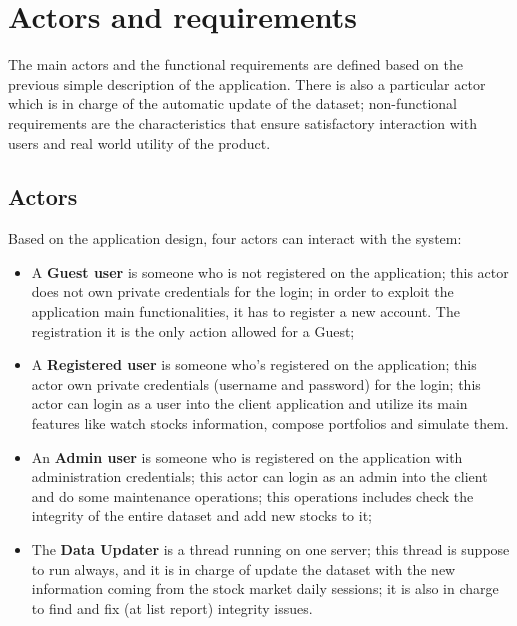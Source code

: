 \chapter{Actors and requirements}
The main actors and the functional requirements are defined based on the previous
simple description of the application. There is also a 
particular actor which is in charge of the automatic update of the dataset; non-functional
requirements are the characteristics that ensure satisfactory interaction with users and 
real world utility of the product.

\section{Actors}
Based on the application design, four actors can interact with the system:
\begin{itemize}
    \item A \textbf{Guest user} is someone who is not registered on the application; this actor does not 
own private credentials for the login; in order to exploit the application main functionalities, 
it has to register a new account. The registration it is the only action allowed for a Guest;

    \item A \textbf{Registered user} is someone who's registered on the application; this actor own
private credentials (username and password) for the login; this actor can login as a user
into the client
application and utilize its main features like watch stocks information, compose portfolios and 
simulate them. 
   
    \item An \textbf{Admin user} is someone who is registered on the application with administration
credentials; this actor can login as an admin into the client and do some maintenance 
operations; this operations includes check the integrity of the entire dataset and add new 
stocks to it;

    \item The \textbf{Data Updater} is a thread running on one server; this thread is suppose to 
run always, and it is in charge of update the dataset with the new information coming from 
the stock market daily sessions; it is also in charge to find and fix (at list report)
integrity issues.

\end{itemize}

